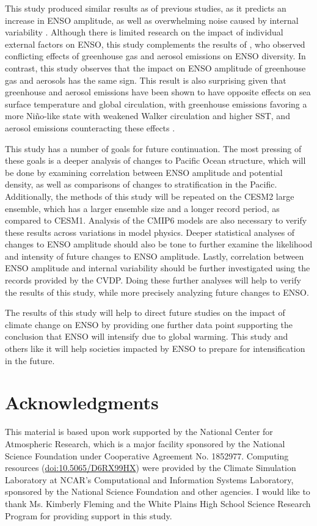 \documentclass[11pt]{article}
\begin{document}
This study produced similar results as of previous studies, as it predicts an increase in ENSO amplitude, as well as overwhelming noise caused by internal variability \citep{maher2018enso}. Although there is limited research on the impact of individual external factors on ENSO, this study complements the results of \citet{stevenson2017forced}, who observed conflicting effects of greenhouse gas and aerosol emissions on ENSO diversity. In contrast, this study observes that the impact on ENSO amplitude of greenhouse gas and aerosols has the same sign. This result is also surprising given that greenhouse and aerosol emissions have been shown to have opposite effects on sea surface temperature and global circulation, with greenhouse emissions favoring a more Niño-like state with weakened Walker circulation and higher SST, and aerosol emissions counteracting these effects \citep{boer2000transient}.

This study has a number of goals for future continuation. The most pressing of these goals is a deeper analysis of changes to Pacific Ocean structure, which will be done by examining correlation between ENSO amplitude and potential density, as well as comparisons of changes to stratification in the Pacific. Additionally, the methods of this study will be repeated on the CESM2 large ensemble, which has a larger ensemble size and a longer record period, as compared to CESM1. Analysis of the CMIP6 models are also necessary to verify these results across variations in model physics. Deeper statistical analyses of changes to ENSO amplitude should also be tone to further examine the likelihood and intensity of future changes to ENSO amplitude. Lastly, correlation between ENSO amplitude and internal variability should be further investigated using the records provided by the CVDP. Doing these further analyses will help to verify the results of this study, while more precisely analyzing future changes to ENSO.

The results of this study will help to direct future studies on the impact of climate change on ENSO by providing one further data point supporting the conclusion that ENSO will intensify due to global warming. This study and others like it will help societies impacted by ENSO to prepare for intensification in the future.

\section{Acknowledgments}

This material is based upon work supported by the National Center for Atmospheric Research, which is a major facility sponsored by the National Science Foundation under Cooperative Agreement No. 1852977. Computing resources (\href{https://doi.org/10.5065/D6RX99HX}{doi:10.5065/D6RX99HX}) were provided by the Climate Simulation Laboratory at NCAR's Computational and Information Systems Laboratory, sponsored by the National Science Foundation and other agencies. I would like to thank Ms. Kimberly Fleming and the White Plains High School Science Research Program for providing support in this study.




\end{document}
